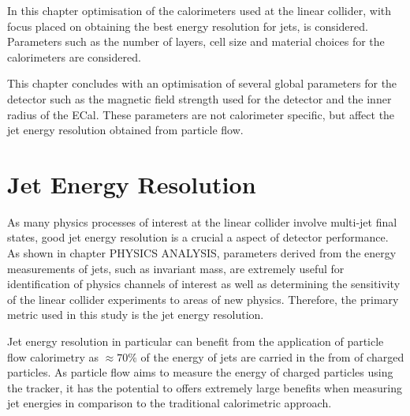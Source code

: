 In this chapter optimisation of the calorimeters used at the linear collider, with focus placed on obtaining the best energy resolution for jets, is considered.  Parameters such as the number of layers, cell size and material choices for the calorimeters are considered.  

This chapter concludes with an optimisation of several global parameters for the detector such as the magnetic field strength used for the detector and the inner radius of the ECal.  These parameters are not calorimeter specific, but affect the jet energy resolution obtained from particle flow. 


\section{Jet Energy Resolution}
\label{sec:optstudiesmetric}
As many physics processes of interest at the linear collider involve multi-jet final states, good jet energy resolution is a crucial a aspect of detector performance.  As shown in chapter PHYSICS ANALYSIS, parameters derived from the energy measurements of jets, such as invariant mass, are extremely useful for identification of physics channels of interest as well as determining the sensitivity of the linear collider experiments to areas of new physics.  Therefore, the primary metric used in this study is the jet energy resolution.

Jet energy resolution in particular can benefit from the application of particle flow calorimetry as $\approx 70 \%$ of the energy of jets are carried in the from of charged particles.  As particle flow aims to measure the energy of charged particles using the tracker, it has the potential to offers extremely large benefits when measuring jet energies in comparison to the traditional calorimetric approach.  


